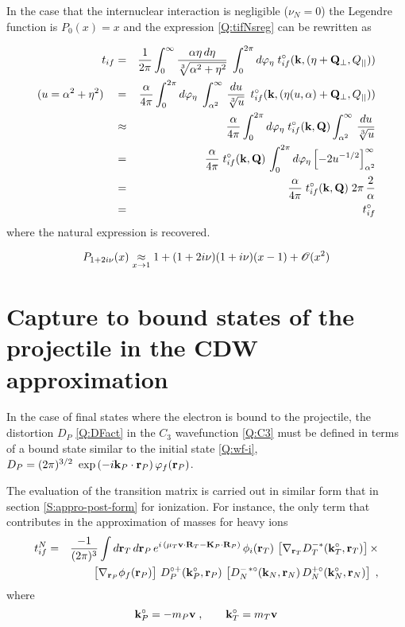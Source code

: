 In the case that the internuclear interaction is negligible
($\nu_{N}=0$) the Legendre function is $P_{0}(x)=x$ and the expression
\ref{Q:tifNsreg} can be rewritten as

\begin{eqnarray*}
t_{if} &=& \frac{1}{2 \pi} \int_{0}^{\infty} \frac{\alpha \eta \, d
\eta}{\sqrt[3]{\alpha^{2}+ \eta^{2}}}  \;\int_{0}^{2 \pi} d
\varphi_{\eta} \;
t^{\circ}_{if}(\mathbf{k},(\mathbf{\eta}+\mathbf{Q}_{\perp},Q_{\mid  \mid })) \\
(u = \alpha^{2}+ \eta^{2}) \quad &=&  \frac{\alpha}{4 \pi} \int_{0}^{2
\pi} d \varphi_{\eta} \; \int_{\alpha^{2}}^{\infty} \, \frac{d u
}{\sqrt[3]{u}} \;\, t^{\circ}_{if}(\mathbf{k},(\mathbf{\eta}(u,\alpha) +
\mathbf{Q}_{\perp},Q_{\mid  \mid }))
\\
&\approx&  \frac{\alpha}{4 \pi} \int_{0}^{2 \pi} d \varphi_{\eta} \;
t^{\circ}_{if}(\mathbf{k},\mathbf{Q}) \int_{\alpha^{2}}^{\infty} \, \frac{d u
} {\sqrt[3]{u}} \\
&=&  \frac{\alpha}{4 \pi} \; t^{\circ}_{if}(\mathbf{k}, \mathbf{Q}) \, \int_{0}^{2
\pi}
d \varphi_{\eta} \left[ - 2 u^{-1/2}\right]_{\alpha^{2}}^{\infty} \\
&=&  \frac{\alpha}{4 \pi} \; t^{\circ}_{if}(\mathbf{k}, \mathbf{Q}) \; 2 \pi \,
\frac{2}{\alpha} \\
&=& t^{\circ}_{if}
\end{eqnarray*}
%
where the natural expression is recovered.

\[
P_{1 + 2 i \nu} (x) \mathrel{\mathop{\kern0pt\approx}\limits_{x \to 1}} 1 + (1+ 2 i \nu)(1 +
i \nu) (x-1) + \mathcal{O}(x^{2})
\]

%
\section{Capture to bound states of the projectile in the CDW
approximation}

In the case of final states where the electron is bound to the
projectile, the distortion $D_{P}$ \ref{Q:DFact} in the $C_{3}$
wavefunction \ref{Q:C3} must be defined in terms of a bound state
similar to the initial state \ref{Q:wf-i}, $D_{P}=(2 \pi)^{3/2}\
\exp{\left(- i \mathbf{k}_{P} \cdot \mathbf{r}_{P} \right)} \, \varphi_{f}
(\mathbf{r}_{P})$.

The evaluation of the transition matrix is carried out in similar form
that in section \ref{S:appro-post-form} for ionization. For instance,
the only term that contributes in the approximation of masses for heavy
ions
\begin{eqnarray}\label{Q:tif-N-cpt}
t^{N}_{if} &=& \frac{-1}{(2 \pi)^{3}}  \int d \vect{r}_{T} \,d
\vect{r}_{P} \, e^{i \, ( \mu_{T}\vect{v} \cdot \vect{R}_{T} -
\vect{K}_{P}  \cdot \vect{R}_{P} ) }\, \phi_{i}(\vect{r}_T) \,\left[
\nabla_{\vect{r}_{T}} D^{-*}_{T}(\vect{k}^{\circ}_{T},\vect{r}_T) \right] {\times}
\\
&&  \left[ \vstretch \nabla_{\vect{r}_{P}} \phi_{f}(\vect{r}_{P}) \right]
\, D^{\circ +}_{P} (\vect{k}_{P}^{\circ},\vect{r}_{P}) \, \left[ D^{-\,\ast
\circ}_{N}(\vect{k}_{N}, \vect{r}_{N} ) \, D^{+ \circ }_{N}
(\vect{k}_{N}^{\circ},\vect{r}_{N}) \right] \; , \nonumber
\end{eqnarray}
where
\[
\mathbf{k}_{P}^{\circ} = - m_{P} \mathbf{v} \; , \qquad \mathbf{k}^{\circ}_{T} = m_{T} \mathbf{v}
\]


